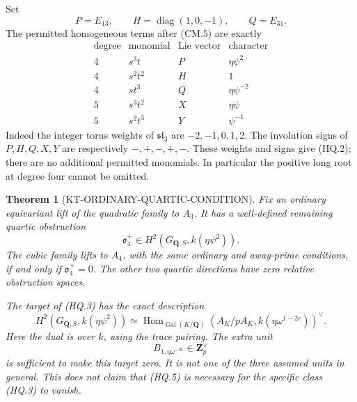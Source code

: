 \documentclass[11pt,a4paper]{article}
\newtheorem{theorem}{Theorem}[section]
\theoremstyle{definition}
\begin{document}
Set
\[
 P=E_{13},\qquad H=\operatorname{diag}(1,0,-1),\qquad Q=E_{31}.
                                                        \tag{HQ.1}
\]
The permitted homogeneous terms after (CM.5) are exactly
\[
 \begin{array}{c|c|c|c}
 \text{degree}&\text{monomial}&\text{Lie vector}&\text{character}\\\hline
 4&s^3t&P&\eta\psi^2\\
 4&s^2t^2&H&1\\
 4&st^3&Q&\eta\psi^{-2}\\
 5&s^3t^2&X&\eta\psi\\
 5&s^2t^3&Y&\psi^{-1}
 \end{array}                                             \tag{HQ.2}
\]
Indeed the integer torus weights of \(\mathfrak{sl}_3\)
are \(-2,-1,0,1,2\).  The involution signs of
\(P,H,Q,X,Y\) are respectively \(-,+,-,+,-\).
These weights and signs give (HQ.2); there are no additional
permitted monomials.  In particular the positive long root
at degree four cannot be omitted.

\begin{theorem}[KT-ORDINARY-QUARTIC-CONDITION]
Fix an ordinary equivariant lift of the quadratic family to
\(A_3\).  It has a well-defined remaining quartic obstruction
\[
 \mathfrak o_4^+\in H^2(G_{\mathbf Q,S},k(\eta\psi^2)).
                                                        \tag{HQ.3}
\]
The cubic family lifts to \(A_4\), with the same ordinary
and away-prime conditions, if and only if
\(\mathfrak o_4^+=0\).  The other two quartic directions
have zero relative obstruction spaces.

The target of (HQ.3) has the exact description
\[
 H^2(G_{\mathbf Q,S},k(\eta\psi^2))
 \simeq
 \operatorname{Hom}_{\operatorname{Gal}(K/\mathbf Q)}
       (A_K/pA_K,k(\eta\omega^{1-2e}))^\vee.
                                                        \tag{HQ.4}
\]
Here the dual is over \(k\), using the trace pairing.
The extra unit
\[
                       B_{1,\eta\omega^{-2e}}\in\mathbf Z_p^\times
                                                        \tag{HQ.5}
\]
is sufficient to make this target zero.  It is not one of
the three assumed units in general.  This does not claim
that (HQ.5) is necessary for the specific class (HQ.3)
to vanish.
\end{theorem}
\end{document}
